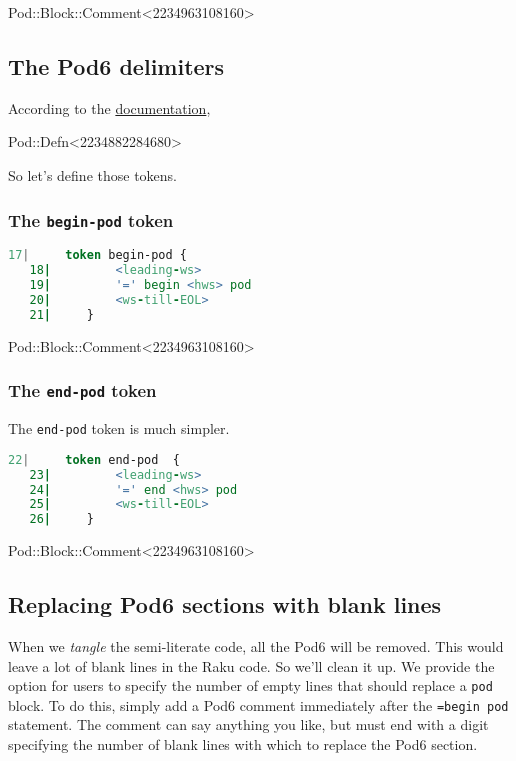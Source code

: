 \documentclass{scrartcl}
\begin{document}
Pod::Block::Comment<2234963108160>

\subsection{The Pod6 delimiters}

According to the \href{https://docs.raku.org/language/pod}{documentation},

Pod::Defn<2234882284680>

So let's define those tokens.

\subsubsection{The \texttt{begin-pod} token}

\begin{lstlisting}[language=Raku]
   17|     token begin-pod {
   18|         <leading-ws>
   19|         '=' begin <hws> pod
   20|         <ws-till-EOL>
   21|     } 

\end{lstlisting}


Pod::Block::Comment<2234963108160>

\subsubsection{The \texttt{end-pod} token}

The \texttt{end-pod} token is much simpler.

\begin{lstlisting}[language=Raku]
   22|     token end-pod  {
   23|         <leading-ws>
   24|         '=' end <hws> pod
   25|         <ws-till-EOL>
   26|     } 

\end{lstlisting}


Pod::Block::Comment<2234963108160>

\subsection{Replacing Pod6 sections with blank lines}

When we \textit{tangle} the semi-literate code, all the Pod6 will be
removed. This would leave a lot of blank lines in the Raku code. So we'll
clean it up. We provide the option for users to specify the number of empty
lines that should replace a \texttt{pod} block. To do this, simply add a
Pod6 comment immediately after the \texttt{=begin pod} statement. The
comment can say anything you like, but must end with a digit specifying the
number of blank lines with which to replace the Pod6 section.
\end{document}
